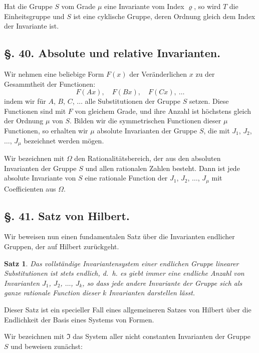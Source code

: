 \documentclass[12pt,a4paper]{article}
\theoremstyle{plain}
\newtheorem{satz}{Satz}[section]
\theoremstyle{definition}
\theoremstyle{remark}
\begin{document}
Hat die Gruppe $S$ vom Grade $\mu$ eine Invariante vom Index $\varrho$, so wird $T$ die Einheitsgruppe und $S$ ist eine cyklische Gruppe, deren Ordnung gleich dem Index der Invariante ist.


\subsection*{\S. 40. Absolute und relative Invarianten.}

Wir nehmen eine beliebige Form $F(x)$ der Veränderlichen $x$ zu der Gesammtheit der Functionen:
\[
F(Ax),\quad F(Bx),\quad F(Cx),\ \ldots
\]
indem wir für $A$, $B$, $C$, $\ldots$ alle Substitutionen der Gruppe $S$ setzen. Diese Functionen sind mit $F$ von gleichem Grade, und ihre Anzahl ist höchstens gleich der Ordnung $\mu$ von $S$. Bilden wir die symmetrischen Functionen dieser $\mu$ Functionen, so erhalten wir $\mu$ absolute Invarianten der Gruppe $S$, die mit $J_{1}$, $J_{2}$, $\ldots$, $J_{\mu}$ bezeichnet werden mögen.

Wir bezeichnen mit $\Omega$ den Rationalitätsbereich, der aus den absoluten Invarianten der Gruppe $S$ und allen rationalen Zahlen besteht. Dann ist jede absolute Invariante von $S$ eine rationale Function der $J_{1}$, $J_{2}$, $\ldots$, $J_{\mu}$ mit Coefficienten aus $\Omega$.


\subsection*{\S. 41. Satz von Hilbert.}

Wir beweisen nun einen fundamentalen Satz über die Invarianten endlicher Gruppen, der auf Hilbert zurückgeht.

\begin{satz}
Das vollständige Invariantensystem einer endlichen Gruppe linearer Substitutionen ist stets \emph{endlich}, d.~h. es giebt immer eine endliche Anzahl von Invarianten $J_{1}$, $J_{2}$, $\ldots$, $J_{k}$, so dass jede andere Invariante der Gruppe sich als ganze rationale Function dieser $k$ Invarianten darstellen lässt.
\end{satz}

Dieser Satz ist ein specieller Fall eines allgemeineren Satzes von Hilbert über die Endlichkeit der Basis eines Systems von Formen.

Wir bezeichnen mit $\mathfrak{I}$ das System aller nicht constanten Invarianten der Gruppe $S$ und beweisen zunächst:
\end{document}
